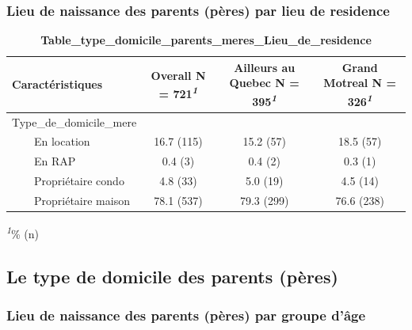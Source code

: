 \documentclass[
]{article}
\begin{document}
\hypertarget{lieu-de-naissance-des-parents-puxe8res-par-lieu-de-residence-1}{%
\subsubsection{Lieu de naissance des parents (pères) par lieu de
residence}\label{lieu-de-naissance-des-parents-puxe8res-par-lieu-de-residence-1}}

\newpage
\begin{table}[!t]
\caption{\label{tab:unnamed-chunk-37}\textbf{Table\_type\_domicile\_parents\_meres\_Lieu\_de\_residence}} 
\fontsize{12.0pt}{14.4pt}\selectfont
\begin{tabular*}{\linewidth}{@{\extracolsep{\fill}}lccc}
\toprule
\textbf{Caractéristiques} & \textbf{Overall}  N = 721\textsuperscript{\textit{1}} & \textbf{Ailleurs au Quebec}  N = 395\textsuperscript{\textit{1}} & \textbf{Grand Motreal}  N = 326\textsuperscript{\textit{1}} \\ 
\midrule\addlinespace[2.5pt]
Type\_de\_domicile\_mere &  &  &  \\ 
    En location & 16.7 (115) & 15.2 (57) & 18.5 (57) \\ 
    En RAP & 0.4 (3) & 0.4 (2) & 0.3 (1) \\ 
    Propriétaire condo & 4.8 (33) & 5.0 (19) & 4.5 (14) \\ 
    Propriétaire maison & 78.1 (537) & 79.3 (299) & 76.6 (238) \\ 
\bottomrule
\end{tabular*}
\begin{minipage}{\linewidth}
\textsuperscript{\textit{1}}\% (n)\\
\end{minipage}
\end{table}

\vspace{2cm}

\hypertarget{le-type-de-domicile-des-parents-puxe8res}{%
\subsection{Le type de domicile des parents
(pères)}\label{le-type-de-domicile-des-parents-puxe8res}}

\newpage

\hypertarget{lieu-de-naissance-des-parents-puxe8res-par-groupe-duxe2ge}{%
\subsubsection{Lieu de naissance des parents (pères) par groupe
d'âge}\label{lieu-de-naissance-des-parents-puxe8res-par-groupe-duxe2ge}}
\end{document}
